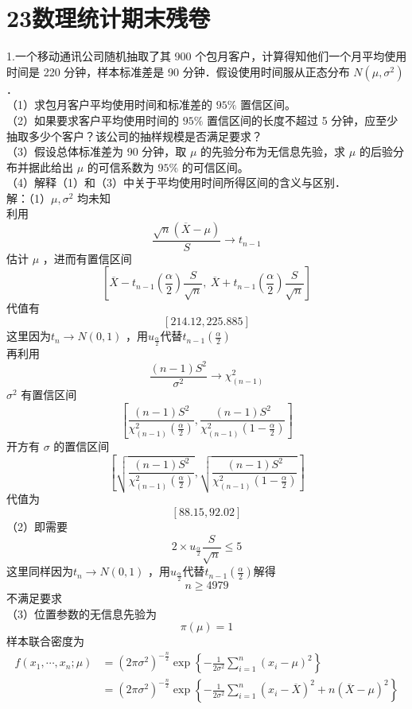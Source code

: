 \documentclass[UTF8,openany]{book}
\begin{document}
	\section{\centering 23数理统计期末残卷}
	\noindent 1.一个移动通讯公司随机抽取了其 900 个包月客户，计算得知他们一个月平均使用时间是 220 分钟，样本标准差是 90 分钟．假设使用时间服从正态分布 $N\left(\mu, \sigma^2\right)$ ．\\
	（1）求包月客户平均使用时间和标准差的 $95 \%$ 置信区间。\\
	（2）如果要求客户平均使用时间的 $95 \%$ 置信区间的长度不超过 5 分钟，应至少抽取多少个客户？该公司的抽样规模是否满足要求？\\
	（3）假设总体标准差为 90 分钟，取 $\mu$ 的先验分布为无信息先验，求 $\mu$ 的后验分布并据此给出 $\mu$ 的可信系数为 $95 \%$ 的可信区间。\\
	（4）解释（1）和（3）中关于平均使用时间所得区间的含义与区别．\\
	解：（1）$\mu, \sigma^2$ 均未知\\
	利用 
	$$\frac{\sqrt{n}(\overline{X}-\mu)}{S} \rightarrow t_{n-1}$$
	估计 $\mu$ ，进而有置信区间
	\[
	\left[ \overline{X} - t_{n-1}\left(\frac{\alpha}{2}\right) \frac{S}{\sqrt{n}},\ 
	\overline{X} + t_{n-1}\left(\frac{\alpha}{2}\right) \frac{S}{\sqrt{n}} \right]
	\]
	代值有
	$$[214.12,225.885]$$ 
	这里因为$t_n\rightarrow N(0,1)$ ，用$u_{\frac{\alpha}{2}}$代替$t_{n-1}\left(\frac{\alpha}{2}\right)$\\
	再利用 
	$$\frac{(n-1) S^2}{\sigma^2} \rightarrow \chi^2_{(n-1)}$$
	$\sigma^2$ 有置信区间 
	$$\left[\frac{(n-1) S^2}{\chi^2_{(n-1)}\left(\frac{\alpha}{2}\right)}, \frac{(n-1) S^2}{\chi^2_{(n-1)}\left(1-\frac{\alpha}{2}\right)}\right]$$
	开方有 $\sigma$ 的置信区间
	$$
	\left[\sqrt{\frac{(n-1) S^2}{\chi^2_{(n-1)}\left(\frac{\alpha}{2}\right)}},\sqrt{\frac{(n-1) S^2}{\chi^2_{(n-1)}\left(1-\frac{\alpha}{2}\right)}}\right]
	$$
	代值为
	\[
	[88.15,92.02]
	\]
	（2）即需要
	\[
	2\times u_{\frac{\alpha}{2}}\frac{S}{\sqrt{n}}\le 5
	\]
	这里同样因为$t_n\rightarrow N(0,1)$ ，用$u_{\frac{\alpha}{2}}$代替$t_{n-1}\left(\frac{\alpha}{2}\right)$解得
	\[
	n\ge 4979
	\]
	不满足要求\\
	（3）位置参数的无信息先验为
	\[
	\pi(\mu)=1
	\]
	样本联合密度为
	\[
	\begin{aligned}
		f(x_1,\cdots,x_n;\mu) & =\left(2 \pi \sigma^2\right)^{-\frac{n}{2}} \exp \left\{-\frac{1}{2 \sigma^2}\sum_{i=1}^{n}\left(x_i-\mu\right)^2\right\} \\
		& =\left(2 \pi \sigma^2\right)^{-\frac{n}{2}} \exp \left\{-\frac{1}{2 \sigma^2} \sum_{i=1}^n\left(x_i-\overline{X}\right)^2+n(\overline{X}-\mu)^2\right\} 
	\end{aligned}
	\]
\end{document}
